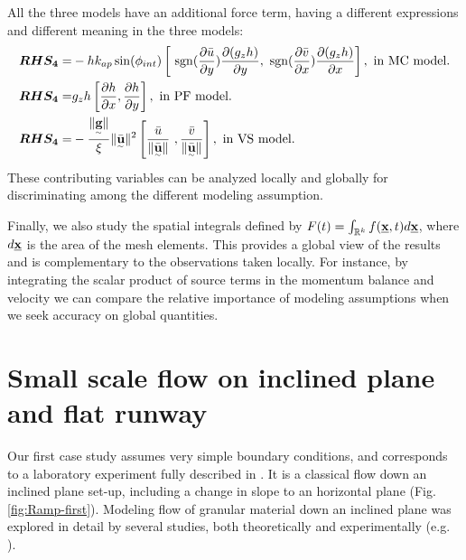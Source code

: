 \documentclass{article}
\begin{document}
All the three models have an additional force term, having a different expressions and different meaning in the three models:
\begin{align}
\boldsymbol{RHS_4} =&  - h k_{ap}\sin(\phi_{int})\left[ \ {\rm sgn}(\frac{\partial \bar{u}}{\partial y}) \frac{\partial (g_z h)}{\partial y},\ {\rm sgn}({\frac{\partial \bar{v}}{\partial x}}) \frac{\partial (g_z h)}{\partial x}\right],\textmd{ in MC model.}\nonumber\\
\boldsymbol{RHS_4} =& g_{z}h\left[\frac{\partial h}{\partial x}, \frac{\partial h}{\partial y}\right],\textmd{ in PF model.}\\
\boldsymbol{RHS_4} =& -\frac{\| \underset{^\sim}{\textbf g} \|}{\xi}\| \underset{^\sim}{\bar{\textbf u}} \|^2\left[\frac{\bar{u}}{\| \underset{^\sim}{\bar{\textbf u}}\|} \ ,\frac{\bar{v}}{\| \underset{^\sim}{\bar{\textbf u}}\|}\right],\textmd{ in VS model.}\nonumber
\end{align}
These contributing variables can be analyzed locally and globally for discriminating among the different modeling assumption.


Finally, we also study the spatial integrals defined by $F(t)=\int_{\mathbb R^k}f(\underline{\textbf x},t) d\underline{\textbf x}$, where $d\underline{\textbf x}$ is the area of the mesh elements. This provides a global view of the results and is complementary to the observations taken locally. For instance, by integrating the scalar product of source terms in the momentum balance and velocity we can compare the relative importance of modeling assumptions when we seek accuracy on global quantities.



\section{Small scale flow on inclined plane and flat runway}\label{sec:QoIs}
Our first case study assumes very simple boundary conditions, and corresponds to a laboratory experiment fully described in \citep{Webb2004, Bursik2005, WebbBursik2016}. It is a classical flow down an inclined plane set-up, including a change in slope to an horizontal plane (Fig. \ref{fig:Ramp-first}). Modeling flow of granular material down an inclined plane was explored in detail by several studies, both theoretically and experimentally (e.g. \citep{RuyerQuil2000, Silbert2001, Pitman2003b}).
\end{document}
